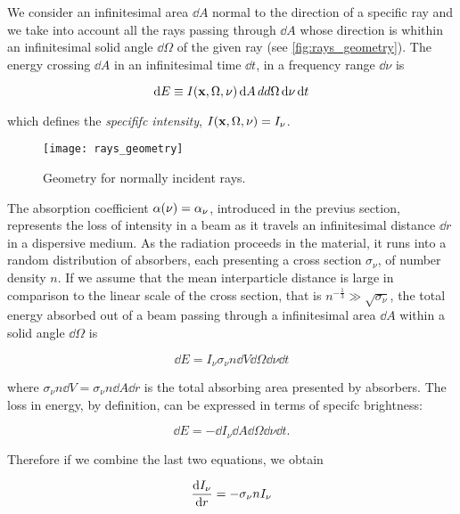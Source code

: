 We consider an infinitesimal area $\dd{A}$ normal to the direction of a
specific ray and we take into account all the rays passing through $\dd{A}$
whose direction is whithin an infinitesimal solid angle $\dd{\Omega}$ of
the given ray (see \autoref{fig:rays_geometry}). The energy crossing
$\dd{A}$ in an infinitesimal time $\dd{t}$, in a frequency range $\dd{\nu}$
is

\begin{equation}
        \dd{E} \equiv
        I\qty(\vb{x},\Omega,\nu)\dd{A}dd{\Omega}\dd{\nu}\dd{t}
\end{equation}

which defines the \emph{specififc intensity}, $I\qty(\vb{x},\Omega,\nu) =
I_\nu$.

\begin{figure}
        \centering
        \texttt{[image: rays\_geometry]}
        \caption{Geometry for normally incident rays.}
        \label{fig:rays_geometry}
\end{figure}

The absorption coefficient $\alpha\qty(\nu) = \alpha_\nu$, introduced in the
previus section, represents the loss of intensity in a beam as it travels an
infinitesimal distance $\dd{r}$ in a dispersive medium. As the radiation
proceeds in the material, it runs into a random distribution of absorbers,
each presenting a cross section $\sigma_\nu$, of number density $n$. If we
assume that the mean interparticle distance is large in comparison to the
linear scale of the cross section, that is $n^{-\frac{1}{3}} \gg
\sqrt{\sigma_\nu}$, the total energy absorbed out of a beam passing
through a infinitesimal area $\dd{A}$ within a solid angle $\dd{\Omega}$ is

\begin{equation}
        \dd{E} = I_\nu \sigma_\nu n \dd{V} \dd{\Omega} \dd{\nu} \dd{t}
\end{equation}

where $\sigma_\nu n \dd{V} = \sigma_\nu n \dd{A} \dd{r}$ is the total
absorbing area presented by absorbers. The loss in energy, by definition,
can be expressed in terms of specifc brightness:

\begin{equation}
        \dd{E} = -\dd{I_\nu} \dd{A} \dd{\Omega} \dd{\nu} \dd{t}.
\end{equation}

Therefore if we combine the last two equations, we obtain

\begin{equation}
        \dv{I_\nu}{r} = -\sigma_\nu n I_\nu
        \label{eq:absorption}
\end{equation}

